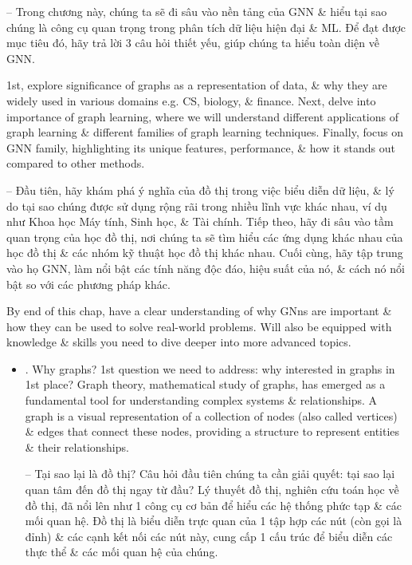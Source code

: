 \documentclass{article}
\begin{document}
\begin{itemize}
    -- Trong chương này, chúng ta sẽ đi sâu vào nền tảng của GNN \& hiểu tại sao chúng là công cụ quan trọng trong phân tích dữ liệu hiện đại \& ML. Để đạt được mục tiêu đó, hãy trả lời 3 câu hỏi thiết yếu, giúp chúng ta hiểu toàn diện về GNN.

    1st, explore significance of graphs as a representation of data, \& why they are widely used in various domains e.g. CS, biology, \& finance. Next, delve into importance of graph learning, where we will understand different applications of graph learning \& different families of graph learning techniques. Finally, focus on GNN family, highlighting its unique features, performance, \& how it stands out compared to other methods.

    -- Đầu tiên, hãy khám phá ý nghĩa của đồ thị trong việc biểu diễn dữ liệu, \& lý do tại sao chúng được sử dụng rộng rãi trong nhiều lĩnh vực khác nhau, ví dụ như Khoa học Máy tính, Sinh học, \& Tài chính. Tiếp theo, hãy đi sâu vào tầm quan trọng của học đồ thị, nơi chúng ta sẽ tìm hiểu các ứng dụng khác nhau của học đồ thị \& các nhóm kỹ thuật học đồ thị khác nhau. Cuối cùng, hãy tập trung vào họ GNN, làm nổi bật các tính năng độc đáo, hiệu suất của nó, \& cách nó nổi bật so với các phương pháp khác.

    By end of this chap, have a clear understanding of why GNns are important \& how they can be used to solve real-world problems. Will also be equipped with knowledge \& skills you need to dive deeper into more advanced topics.
    \begin{itemize}
        \item {. Why graphs?} 1st question we need to address: why interested in graphs in 1st place? Graph theory, mathematical study of graphs, has emerged as a fundamental tool for understanding complex systems \& relationships. A graph is a visual representation of a collection of nodes (also called vertices) \& edges that connect these nodes, providing a structure to represent entities \& their relationships.

        -- {\sf Tại sao lại là đồ thị?} Câu hỏi đầu tiên chúng ta cần giải quyết: tại sao lại quan tâm đến đồ thị ngay từ đầu? Lý thuyết đồ thị, nghiên cứu toán học về đồ thị, đã nổi lên như 1 công cụ cơ bản để hiểu các hệ thống phức tạp \& các mối quan hệ. Đồ thị là biểu diễn trực quan của 1 tập hợp các nút (còn gọi là đỉnh) \& các cạnh kết nối các nút này, cung cấp 1 cấu trúc để biểu diễn các thực thể \& các mối quan hệ của chúng.


\end{itemize}
\end{itemize}
\end{document}
